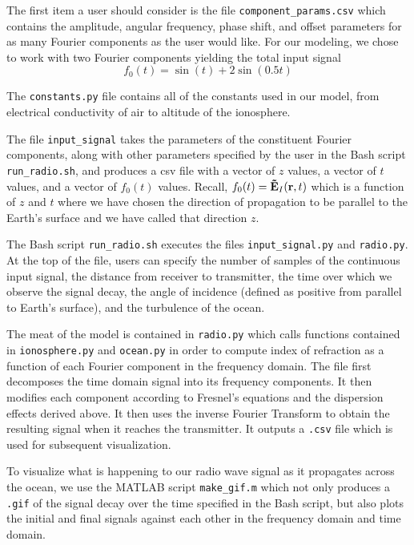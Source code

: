\documentclass[11pt]{article}
\numberwithin{equation}{section}
\begin{document}
The first item a user should consider is the file \verb|component_params.csv| which contains the amplitude, angular frequency, phase shift, and offset parameters for as many Fourier components as the user would like. For our modeling, we chose to work with two Fourier components yielding the total input signal
\begin{equation}
f_{0}(t) = \sin(t) + 2\sin(0.5t)
\end{equation}
\par The \verb|constants.py| file contains all of the constants used in our model, from electrical conductivity of air to altitude of the ionosphere.
\par The file \verb|input_signal| takes the parameters of the constituent Fourier components, along with other parameters specified by the user in the Bash script \verb|run_radio.sh|, and produces a csv file with a vector of $z$ values, a vector of $t$ values, and a vector of $f_{0}(t)$ values. Recall, $f_{0}(t) = {\bf \tilde{E}}_{I}({\bf r}, t)$ which is a function of $z$ and $t$ where we have chosen the direction of propagation to be parallel to the Earth's surface and we have called that direction $z$.
\par The Bash script \verb|run_radio.sh| executes the files \verb|input_signal.py| and \verb|radio.py|. At the top of the file, users can specify the number of samples of the continuous input signal, the distance from receiver to transmitter, the time over which we observe the signal decay, the angle of incidence (defined as positive from parallel to Earth's surface), and the turbulence of the ocean.
\par The meat of the model is contained in \verb|radio.py| which calls functions contained in \verb|ionosphere.py| and \verb|ocean.py| in order to compute index of refraction as a function of each Fourier component in the frequency domain. The file first decomposes the time domain signal into its frequency components. It then modifies each component according to Fresnel's equations and the dispersion effects derived above. It then uses the inverse Fourier Transform to obtain the resulting signal when it reaches the transmitter. It outputs a \verb|.csv| file which is used for subsequent visualization.
\par To visualize what is happening to our radio wave signal as it propagates across the ocean, we use the MATLAB script \verb|make_gif.m| which not only produces a \verb|.gif| of the signal decay over the time specified in the Bash script, but also plots the initial and final signals against each other in the frequency domain and time domain.
\end{document}
